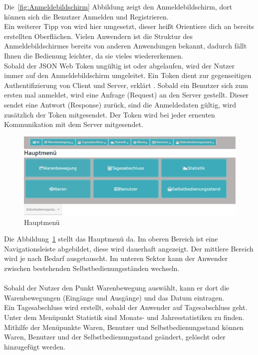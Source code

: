 Die~\ref{fig:Anmeldebildschirm} Abbildung zeigt den Anmeldebildschirm, dort können sich die Benutzer Anmelden und Registrieren.
\\
Ein weiterer Tipp von \cite{gui} wird hier umgesetzt, dieser heißt \glqq Orientiere dich an bereits erstellten Oberflächen\grqq{}. Vielen Anwendern ist die Struktur des Anmeldebildschirmes bereits von anderen Anwendungen bekannt, dadurch fällt Ihnen die Bedienung leichter, da sie vieles wiedererkennen.
\\
Sobald der JSON Web Token ungültig ist oder abgelaufen, wird der Nutzer immer auf den Anmeldebildschirm umgeleitet. Ein Token dient zur gegenseitigen Authentifizierung von Client und Server, erklärt \cite{token}. Sobald ein Benutzer sich zum ersten mal anmeldet, wird eine Anfrage (Request) an den Server gestellt. Dieser sendet eine Antwort (Response) zurück, sind die Anmeldedaten gültig, wird zusätzlich der Token mitgesendet. Der Token wird bei jeder erneuten Kommunikation mit dem Server mitgesendet.

\begin{figure}[htb]
	\centering
	\includegraphics[width=1\textwidth,angle=0]{abb/hauptm}
	\caption[Hauptmenü]{Hauptmenü}
	\label{fig:Hauptmenü}
\end{figure}

Die Abbildung~\ref{fig:Hauptmenü} stellt das Hauptmenü da. Im oberen Bereich ist eine Navigationsleiste abgebildet, diese wird dauerhaft angezeigt. Der mittlere Bereich wird je nach Bedarf ausgetauscht. Im unteren Sektor kann der Anwender zwischen bestehenden Selbstbedienungsständen wechseln. 
\\
\\
Sobald der Nutzer den Punkt Warenbewegung auswählt, kann er dort die Warenbewegungen (Eingänge und Ausgänge) und das Datum eintragen.
\\
Ein Tagesabschluss wird erstellt, sobald der Anwender auf Tagesabschluss geht.
\\
Unter dem Menüpunkt Statistik sind Monats- und Jahresstatistiken zu finden.
\\
Mithilfe der Menüpunkte Waren, Benutzer und Selbstbedienungsstand können Waren, Benutzer und der Selbstbedienungsstand geändert, gelöscht oder hinzugefügt werden. 


